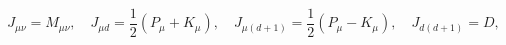\begin{equation}
J_{\mu \nu }=M_{\mu \nu },\quad
 J_{\mu d}=\frac{1}{2}(P_\mu + K_\mu),\quad
 J_{\mu (d+1)}=\frac{1}{2}(P_\mu-K_\mu),
 \quad
 J_{d(d+1)}=D,
 \label{ident}
\end{equation}

